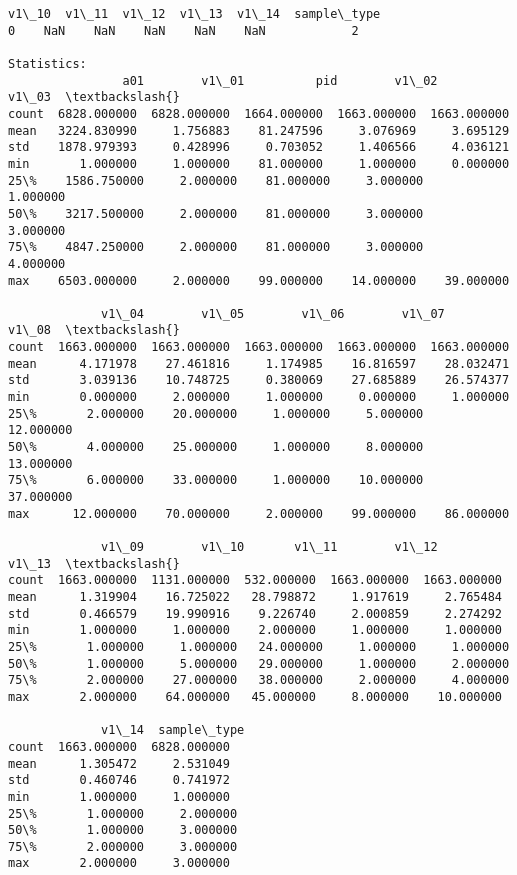 \documentclass[11pt]{article}
\begin{document}
\begin{Verbatim}[commandchars=\\\{\}]
   v1\_10  v1\_11  v1\_12  v1\_13  v1\_14  sample\_type  
0    NaN    NaN    NaN    NaN    NaN            2  

Statistics: 
                a01        v1\_01          pid        v1\_02        v1\_03  \textbackslash{}
count  6828.000000  6828.000000  1664.000000  1663.000000  1663.000000   
mean   3224.830990     1.756883    81.247596     3.076969     3.695129   
std    1878.979393     0.428996     0.703052     1.406566     4.036121   
min       1.000000     1.000000    81.000000     1.000000     0.000000   
25\%    1586.750000     2.000000    81.000000     3.000000     1.000000   
50\%    3217.500000     2.000000    81.000000     3.000000     3.000000   
75\%    4847.250000     2.000000    81.000000     3.000000     4.000000   
max    6503.000000     2.000000    99.000000    14.000000    39.000000   

             v1\_04        v1\_05        v1\_06        v1\_07        v1\_08  \textbackslash{}
count  1663.000000  1663.000000  1663.000000  1663.000000  1663.000000   
mean      4.171978    27.461816     1.174985    16.816597    28.032471   
std       3.039136    10.748725     0.380069    27.685889    26.574377   
min       0.000000     2.000000     1.000000     0.000000     1.000000   
25\%       2.000000    20.000000     1.000000     5.000000    12.000000   
50\%       4.000000    25.000000     1.000000     8.000000    13.000000   
75\%       6.000000    33.000000     1.000000    10.000000    37.000000   
max      12.000000    70.000000     2.000000    99.000000    86.000000   

             v1\_09        v1\_10       v1\_11        v1\_12        v1\_13  \textbackslash{}
count  1663.000000  1131.000000  532.000000  1663.000000  1663.000000   
mean      1.319904    16.725022   28.798872     1.917619     2.765484   
std       0.466579    19.990916    9.226740     2.000859     2.274292   
min       1.000000     1.000000    2.000000     1.000000     1.000000   
25\%       1.000000     1.000000   24.000000     1.000000     1.000000   
50\%       1.000000     5.000000   29.000000     1.000000     2.000000   
75\%       2.000000    27.000000   38.000000     2.000000     4.000000   
max       2.000000    64.000000   45.000000     8.000000    10.000000   

             v1\_14  sample\_type  
count  1663.000000  6828.000000  
mean      1.305472     2.531049  
std       0.460746     0.741972  
min       1.000000     1.000000  
25\%       1.000000     2.000000  
50\%       1.000000     3.000000  
75\%       2.000000     3.000000  
max       2.000000     3.000000  


\end{Verbatim}
\end{document}
